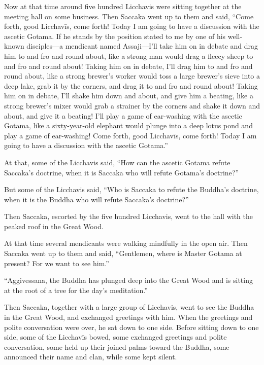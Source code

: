 \documentclass[12pt,openany]{book}%
\begin{document}
Now at that time around five hundred Licchavis were sitting together at the meeting hall on some business. Then Saccaka went up to them and said, “Come forth, good \textsanskrit{Licchavīs}, come forth! Today I am going to have a discussion with the ascetic Gotama. If he stands by the position stated to me by one of his well-known disciples—a mendicant named Assaji—I’ll take him on in debate and drag him to and fro and round about, like a strong man would drag a fleecy sheep to and fro and round about! Taking him on in debate, I’ll drag him to and fro and round about, like a strong brewer’s worker would toss a large brewer’s sieve into a deep lake, grab it by the corners, and drag it to and fro and round about! Taking him on in debate, I’ll shake him down and about, and give him a beating, like a strong brewer’s mixer would grab a strainer by the corners and shake it down and about, and give it a beating! I’ll play a game of ear-washing with the ascetic Gotama, like a sixty-year-old elephant would plunge into a deep lotus pond and play a game of ear-washing! Come forth, good \textsanskrit{Licchavīs}, come forth! Today I am going to have a discussion with the ascetic Gotama.” 

At that, some of the Licchavis said, “How can the ascetic Gotama refute Saccaka’s doctrine, when it is Saccaka who will refute Gotama’s doctrine?” 

But some of the Licchavis said, “Who is Saccaka to refute the Buddha’s doctrine, when it is the Buddha who will refute Saccaka’s doctrine?” 

Then Saccaka, escorted by the five hundred Licchavis, went to the hall with the peaked roof in the Great Wood. 

At that time several mendicants were walking mindfully in the open air. Then Saccaka went up to them and said, “Gentlemen, where is Master Gotama at present? For we want to see him.” 

“Aggivessana, the Buddha has plunged deep into the Great Wood and is sitting at the root of a tree for the day’s meditation.” 

Then Saccaka, together with a large group of Licchavis, went to see the Buddha in the Great Wood, and exchanged greetings with him. When the greetings and polite conversation were over, he sat down to one side. Before sitting down to one side, some of the \textsanskrit{Licchavīs} bowed, some exchanged greetings and polite conversation, some held up their joined palms toward the Buddha, some announced their name and clan, while some kept silent. 
\end{document}
